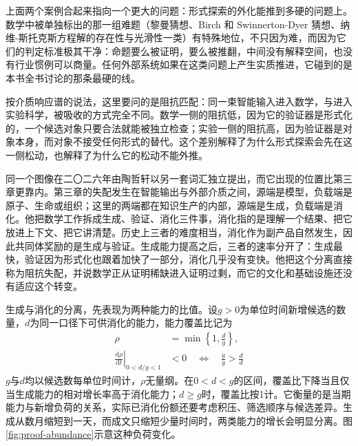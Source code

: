 
上面两个案例合起来指向一个更大的问题：形式探索的外化能推到多硬的问题上。数学中被单独标出的那一组难题（黎曼猜想、Birch 和 Swinnerton-Dyer 猜想、纳维-斯托克斯方程解的存在性与光滑性一类）有特殊地位，不只因为难，而因为它们的判定标准极其干净：命题要么被证明，要么被推翻，中间没有解释空间，也没有行业惯例可以商量。任何外部系统如果在这类问题上产生实质推进，它碰到的是本书全书讨论的那条最硬的线。

按介质响应谱的说法，这里要问的是阻抗匹配：同一束智能输入进入数学，与进入实验科学，被吸收的方式完全不同。数学一侧的阻抗低，因为它的验证器是形式化的，一个候选对象只要合法就能被独立检查；实验一侧的阻抗高，因为验证器是对象本身，而对象不接受任何形式的替代。这个差别解释了为什么形式探索会先在这一侧松动，也解释了为什么它的松动不能外推。

同一个图像在二〇二六年由陶哲轩以另一套词汇独立提出，而它出现的位置比第三章更靠内。第三章的失配发生在智能输出与外部介质之间，源端是模型，负载端是原子、生命或组织；这里的两端都在知识生产的内部，源端是生成，负载端是消化。他把数学工作拆成生成、验证、消化三件事，消化指的是理解一个结果、把它放进上下文、把它讲清楚。历史上三者的难度相当，消化作为副产品自然发生，因此共同体奖励的是生成与验证。生成能力提高之后，三者的速率分开了：生成最快，验证因为形式化也跟着加快了一部分，消化几乎没有变快。他把这个分离直接称为阻抗失配，并说数学正从证明稀缺进入证明过剩，而它的文化和基础设施还没有适应这个转变。\cite{tao2026aiviews}

生成与消化的分离，先表现为两种能力的比值。设$g>0$为单位时间新增候选的数量，$d$为同一口径下可供消化的能力，能力覆盖比记为
\begin{equation}
\begin{split}
\rho&=\min\!\left\{1,\frac{d}{g}\right\},\\
\left.\frac{\mathrm{d}\rho}{\mathrm{d}t}\right|_{0<d/g<1}&<0
\quad\Longleftrightarrow\quad
\frac{\dot g}{g}>\frac{\dot d}{d}
\end{split}
\label{eq:digestion-share}
\end{equation}
$g$与$d$均以候选数每单位时间计，$\rho$无量纲。在$0<d<g$的区间，覆盖比下降当且仅当生成能力的相对增长率高于消化能力；$d\ge g$时，覆盖比按1计。它衡量的是当期能力与新增负荷的关系，实际已消化份额还要考虑积压、筛选顺序与候选差异。生成从数月缩短到一天，而成文只缩短少量时间时，两类能力的增长会明显分离。图\ref{fig:proof-abundance}示意这种负荷变化。

